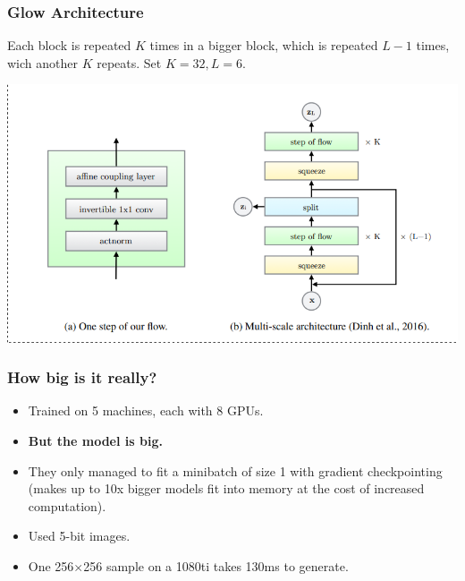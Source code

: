 \documentclass{beamer}
\begin{document}

\begin{frame}
  \frametitle{Glow Architecture}
  Each block is repeated $K$ times in a bigger block, which is repeated $L-1$
  times, wich another $K$ repeats. Set $K = 32, L = 6$.

  \includegraphics[width=1.0\textwidth]{glow-arch.png}
\end{frame}


\begin{frame}
  \frametitle{How big is it really?}

  \begin{itemize}
    \item Trained on 5 machines, each with 8 GPUs.
    \item \textbf{But the model is big.}
    \item They only managed to fit a minibatch of size 1 with gradient
      checkpointing (makes up to 10x bigger models fit into memory at the cost
      of increased computation).
    \item Used 5-bit images.

    \item One 256$\times$256 sample on a 1080ti takes 130ms to generate.
  \end{itemize}


\end{frame}
\end{document}
